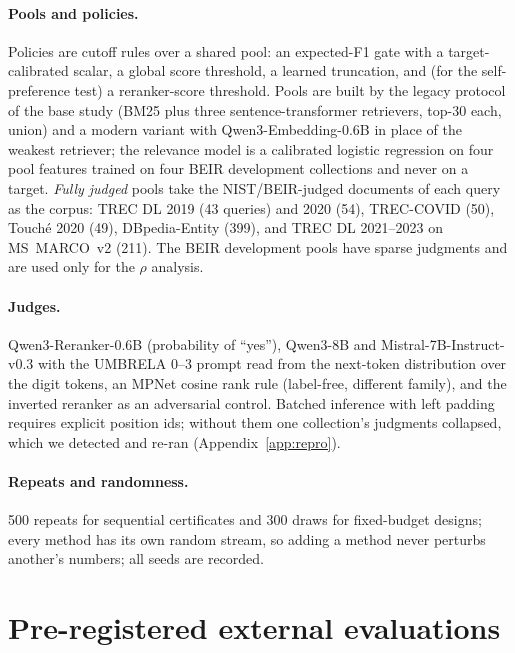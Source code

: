 \documentclass{article}
\begin{document}
\paragraph{Pools and policies.} Policies are cutoff rules over a shared pool: an expected-F1 gate with a target-calibrated scalar, a global score threshold, a learned truncation, and (for the self-preference test) a reranker-score threshold. Pools are built by the legacy protocol of the base study (BM25 plus three sentence-transformer retrievers, top-30 each, union) and a modern variant with Qwen3-Embedding-0.6B in place of the weakest retriever; the relevance model is a calibrated logistic regression on four pool features trained on four BEIR development collections and never on a target. \emph{Fully judged} pools take the NIST/BEIR-judged documents of each query as the corpus: TREC DL 2019 (43 queries) and 2020 (54), TREC-COVID (50), Touch\'e 2020 (49), DBpedia-Entity (399), and TREC DL 2021--2023 on MS~MARCO~v2 (211). The BEIR development pools have sparse judgments and are used only for the $\rho$ analysis.
\paragraph{Judges.} Qwen3-Reranker-0.6B (probability of ``yes''), Qwen3-8B and Mistral-7B-Instruct-v0.3 with the UMBRELA 0--3 prompt \citep{upadhyay2024umbrela} read from the next-token distribution over the digit tokens, an MPNet cosine rank rule (label-free, different family), and the inverted reranker as an adversarial control. Batched inference with left padding requires explicit position ids; without them one collection's judgments collapsed, which we detected and re-ran (Appendix~\ref{app:repro}).
\paragraph{Repeats and randomness.} 500 repeats for sequential certificates and 300 draws for fixed-budget designs; every method has its own random stream, so adding a method never perturbs another's numbers; all seeds are recorded.

\section{Pre-registered external evaluations}\label{sec:prereg}
\end{document}
